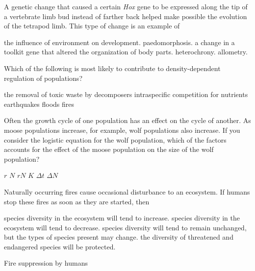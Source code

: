 \question
A genetic change that caused a certain \textit{Hox} gene to be expressed along the tip of a vertebrate limb bud instead of farther back helped make possible the  evolution of the tetrapod limb. This type of change is an example of 
\begin{choices}
\choice the influence of environment on development.%
\choice paedomorphosis.%
\correctchoice a change in a toolkit gene that altered the organization of body parts.%
\choice heterochrony.%
\choice allometry.%
\end{choices}

\question
Which of the following is most likely to contribute to density-dependent regulation of populations?

\begin{choices}
\choice the removal of toxic waste by decomposers%
\correctchoice intraspecific competition for nutrients%
\choice earthquakes%
\choice floods%
\choice fires%
\end{choices}

\question
Often the growth cycle of one population has an effect on the cycle of another. As moose populations increase, for example, wolf populations also increase. If you consider the logistic equation for the wolf population, which of the factors accounts for the effect of the moose population on the size of the wolf population?

\begin{choices}
\choice $r$%
\choice $N$%
\choice $rN$%
\correctchoice $K$%
\choice $\Delta t$%
\choice $\Delta N$%
\end{choices}


\question
Naturally occurring fires cause occasional disturbance to an ecosystem. If humans stop these fires as soon as they are started, then

\begin{choices}
\choice species diversity in the ecosystem will tend to increase.%
\correctchoice species diversity in the ecosystem will tend to decrease.%
\choice species diversity will tend to remain unchanged, but the types of species present may change.%
\choice the diversity of threatened and endangered species will be protected.%
\end{choices}

\question
Fire suppression by humans

